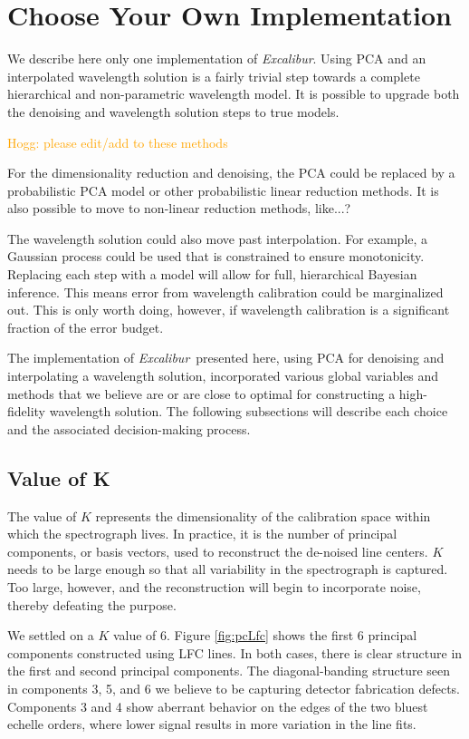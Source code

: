 \documentclass[modern]{aastex63}
\newcommand{\project}[1]{\textsl{#1}}
\newcommand{\name}{\project{Excalibur}}
\newcommand{\lz}[1]{\textcolor{orange}{#1}}
\begin{document}
\section{Choose Your Own Implementation} \label{sec:choices}
We describe here only one implementation of \name.  Using PCA and an interpolated wavelength solution is a fairly trivial step towards a complete hierarchical and non-parametric wavelength model.  It is possible to upgrade both the denoising and wavelength solution steps to true models.

\lz{Hogg: please edit/add to these methods}

For the dimensionality reduction and denoising, the PCA could be replaced by a probabilistic PCA model or other probabilistic linear reduction methods.  It is also possible to move to non-linear reduction methods, like...?

The wavelength solution could also move past interpolation.  For example, a Gaussian process could be used that is constrained to ensure monotonicity.  Replacing each step with a model will allow for full, hierarchical Bayesian inference.  This means error from wavelength calibration could be marginalized out.  This is only worth doing, however, if wavelength calibration is a significant fraction of the error budget.

The implementation of \name\ presented here, using PCA for denoising and interpolating a wavelength solution, incorporated various global variables and methods that we believe are or are close to optimal for constructing a high-fidelity wavelength solution.  The following subsections will describe each choice and the associated decision-making process.

\subsection{Value of K}
\label{sec:choice_k}
The value of $K$ represents the dimensionality of the calibration space within which the spectrograph lives.  In practice, it is the number of principal components, or basis vectors, used to reconstruct the de-noised line centers.  $K$ needs to be large enough so that all variability in the spectrograph is captured.  Too large, however, and the reconstruction will begin to incorporate noise, thereby defeating the purpose.

We settled on a $K$ value of 6.  Figure \ref{fig:pcLfc} shows the first 6 principal components constructed using LFC lines.  In both cases, there is clear structure in the first and second principal components.  The diagonal-banding structure seen in components 3, 5, and 6 we believe to be capturing detector fabrication defects.  Components 3 and 4 show aberrant behavior on the edges of the two bluest echelle orders, where lower signal results in more variation in the line fits.
\end{document}

